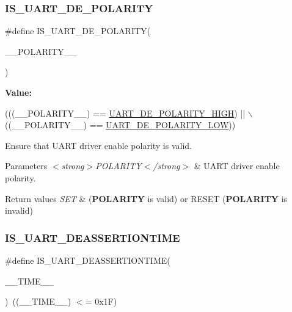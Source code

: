 \subsubsection{\texorpdfstring{I\+S\+\_\+\+U\+A\+R\+T\+\_\+\+D\+E\+\_\+\+P\+O\+L\+A\+R\+I\+TY}{IS\_UART\_DE\_POLARITY}}
{\footnotesize\ttfamily \#define I\+S\+\_\+\+U\+A\+R\+T\+\_\+\+D\+E\+\_\+\+P\+O\+L\+A\+R\+I\+TY(\begin{DoxyParamCaption}\item[{}]{\+\_\+\+\_\+\+P\+O\+L\+A\+R\+I\+T\+Y\+\_\+\+\_\+ }\end{DoxyParamCaption})}

{\bfseries Value\+:}
\begin{DoxyCode}
(((\_\_POLARITY\_\_) == \hyperlink{group___u_a_r_t___driver_enable___polarity_ga0cff167e046507f91497853b772282c5}{UART\_DE\_POLARITY\_HIGH}) || \(\backslash\)
                                              ((\_\_POLARITY\_\_) == 
      \hyperlink{group___u_a_r_t___driver_enable___polarity_ga92a5839b1b14f95ee4b8f4842a24f37b}{UART\_DE\_POLARITY\_LOW}))
\end{DoxyCode}


Ensure that U\+A\+RT driver enable polarity is valid. 


\begin{DoxyParams}{Parameters}
{\em $<$strong$>$\+P\+O\+L\+A\+R\+I\+T\+Y$<$/strong$>$} & U\+A\+RT driver enable polarity. \\
\hline
\end{DoxyParams}

\begin{DoxyRetVals}{Return values}
{\em S\+ET} & ({\bfseries P\+O\+L\+A\+R\+I\+TY} is valid) or R\+E\+S\+ET ({\bfseries P\+O\+L\+A\+R\+I\+TY} is invalid) \\
\hline
\end{DoxyRetVals}
\mbox{\label{group___u_a_r_t___private___macros_ga7e060b24713e3fb49f4f0f4fa71dd85f}} 
\subsubsection{\texorpdfstring{I\+S\+\_\+\+U\+A\+R\+T\+\_\+\+D\+E\+A\+S\+S\+E\+R\+T\+I\+O\+N\+T\+I\+ME}{IS\_UART\_DEASSERTIONTIME}}
{\footnotesize\ttfamily \#define I\+S\+\_\+\+U\+A\+R\+T\+\_\+\+D\+E\+A\+S\+S\+E\+R\+T\+I\+O\+N\+T\+I\+ME(\begin{DoxyParamCaption}\item[{}]{\+\_\+\+\_\+\+T\+I\+M\+E\+\_\+\+\_\+ }\end{DoxyParamCaption})~((\+\_\+\+\_\+\+T\+I\+M\+E\+\_\+\+\_\+) $<$= 0x1\+F)}



